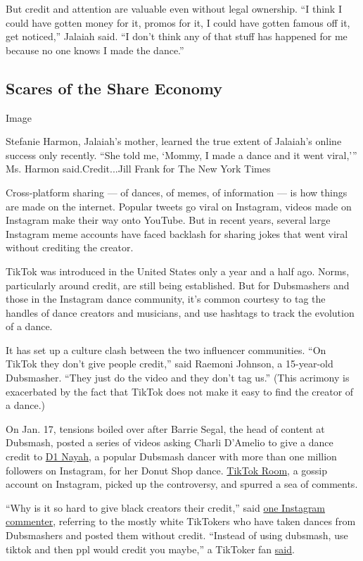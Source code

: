 But credit and attention are valuable even without legal ownership. ``I
think I could have gotten money for it, promos for it, I could have
gotten famous off it, get noticed,'' Jalaiah said. ``I don't think any
of that stuff has happened for me because no one knows I made the
dance.''

\hypertarget{scares-of-the-share-economy}{%
\subsection{Scares of the Share
Economy}\label{scares-of-the-share-economy}}

Image

Stefanie Harmon, Jalaiah's mother, learned the true extent of Jalaiah's
online success only recently. ``She told me, `Mommy, I made a dance and
it went viral,''' Ms. Harmon said.Credit...Jill Frank for The New York
Times

Cross-platform sharing --- of dances, of memes, of information --- is
how things are made on the internet. Popular tweets go viral on
Instagram, videos made on Instagram make their way onto YouTube. But in
recent years, several large Instagram meme accounts have faced backlash
for sharing jokes that went viral without crediting the creator.

TikTok was introduced in the United States only a year and a half ago.
Norms, particularly around credit, are still being established. But for
Dubsmashers and those in the Instagram dance community, it's common
courtesy to tag the handles of dance creators and musicians, and use
hashtags to track the evolution of a dance.

It has set up a culture clash between the two influencer communities.
``On TikTok they don't give people credit,'' said Raemoni Johnson, a
15-year-old Dubsmasher. ``They just do the video and they don't tag
us.'' (This acrimony is exacerbated by the fact that TikTok does not
make it easy to find the creator of a dance.)

On Jan. 17, tensions boiled over after Barrie Segal, the head of content
at Dubsmash, posted a series of videos asking Charli D'Amelio to give a
dance credit to \href{https://www.instagram.com/thereald1.nayah/}{D1
Nayah}, a popular Dubsmash dancer with more than one million followers
on Instagram, for her Donut Shop dance.
\href{https://www.instagram.com/p/B7fThb4nSrH/}{TikTok Room}, a gossip
account on Instagram, picked up the controversy, and spurred a sea of
comments.

``Why is it so hard to give black creators their credit,'' said
\href{https://www.instagram.com/chickenlegbiz/}{one Instagram
commenter}, referring to the mostly white TikTokers who have taken
dances from Dubsmashers and posted them without credit. ``Instead of
using dubsmash, use tiktok and then ppl would credit you maybe,'' a
TikToker fan \href{https://www.instagram.com/annielebob/}{said}.

